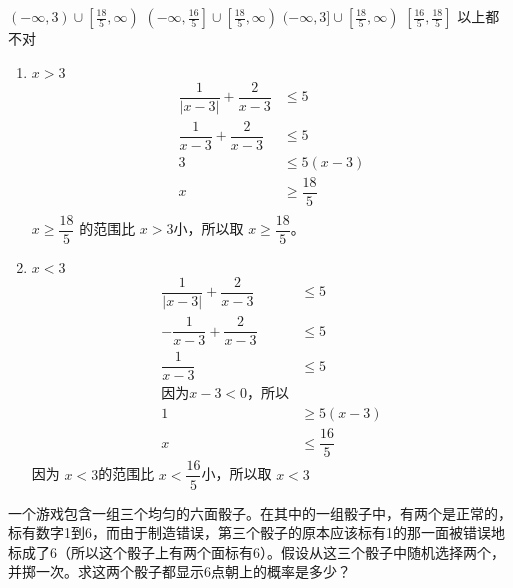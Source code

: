 \documentclass[answers]{exam}
\begin{document}
\begin{questions}
	\begin{oneparchoices}
		\CorrectChoice \( (-\infty, 3) \cup \left[\frac{18}{5}, \infty\right)\)
			\choice \( \left(-\infty, \frac{16}{5}\right] \cup \left[\frac{18}{5}, \infty\right)\)
			\choice \( (-\infty, 3] \cup \left[\frac{18}{5}, \infty\right)\)
		\choice \( \left[ \frac{16}{5}, \frac{18}{5}\right] \)
		\choice 以上都不对
	\end{oneparchoices}

	\begin{solution}
		\begin{enumerate}
			\item \( x > 3 \)
			      \begin{align*}
				      \dfrac{1}{|x-3|} + \dfrac{2}{x-3}   & \le 5             \\
				      \dfrac{1}{x - 3} + \dfrac{2}{x - 3} & \le 5             \\
				      3                                   & \le 5(x-3)        \\
				      x                                   & \ge \dfrac{18}{5} \\
			      \end{align*}
			      \( x \ge \dfrac{18}{5} \) 的范围比 \( x > 3 \)小，所以取 \( x \ge \dfrac{18}{5} \)。
			\item \( x < 3 \)
			      \begin{align*}
				      \dfrac{1}{|x-3|} + \dfrac{2}{x-3} & \le 5             \\
				      -\dfrac{1}{x-3} + \dfrac{2}{x-3}  & \le 5             \\
				      \dfrac{1}{x-3}                    & \le 5             \\
				      \text{因为} x - 3 < 0， \text{所以}                   \\
				      1                                 & \ge 5(x - 3)      \\
				      x                                 & \le \dfrac{16}{5}
			      \end{align*}
			      因为 \( x < 3 \)的范围比 \( x < \dfrac{16}{5} \)小，所以取 \( x < 3 \)
		\end{enumerate}
	\end{solution}

	\question 一个游戏包含一组三个均匀的六面骰子。在其中的一组骰子中，有两个是正常的，标有数字1到6，而由于制造错误，第三个骰子的原本应该标有1的那一面被错误地标成了6（所以这个骰子上有两个面标有6）。假设从这三个骰子中随机选择两个，并掷一次。求这两个骰子都显示6点朝上的概率是多少？


\end{questions}
\end{document}
